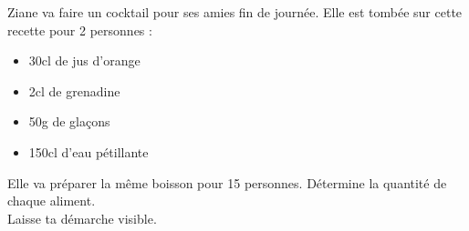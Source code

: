 %
%
    Ziane va faire un cocktail pour ses amies fin de journée.
    Elle est tombée sur cette recette pour 2 personnes :
    \begin{itemize}[label=\faCocktail]
        \item 30cl de jus d’orange
        \item 2cl de grenadine
        \item 50g de glaçons
        \item 150cl d’eau pétillante
    \end{itemize}
    Elle va préparer la même boisson pour 15 personnes.
    Détermine la quantité de chaque aliment.\\
    Laisse ta démarche visible.
